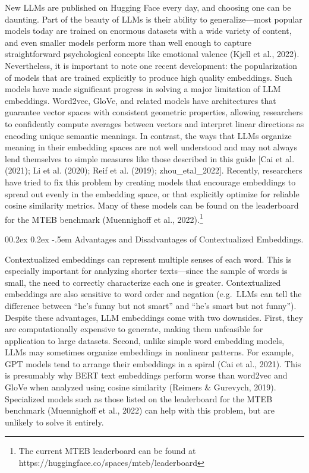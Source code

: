 \documentclass[
  man,
  floatsintext,
  longtable,
  nolmodern,
  notxfonts,
  notimes,
  colorlinks=true,linkcolor=blue,citecolor=blue,urlcolor=blue]{apa7}
\makeatletter
\renewcommand{\paragraph}{\@startsection{paragraph}{4}{\parindent}%
	{0\baselineskip \@plus 0.2ex \@minus 0.2ex}%
	{-.5em}%
	{\normalfont\normalsize\bfseries\typesectitle}}
\makeatother
\begin{document}
New LLMs are published on Hugging Face every day, and choosing one can
be daunting. Part of the beauty of LLMs is their ability to
generalize---most popular models today are trained on enormous datasets
with a wide variety of content, and even smaller models perform more
than well enough to capture straightforward psychological concepts like
emotional valence (Kjell et al., 2022). Nevertheless, it is important to
note one recent development: the popularization of models that are
trained explicitly to produce high quality embeddings. Such models have
made significant progress in solving a major limitation of LLM
embeddings. Word2vec, GloVe, and related models have architectures that
guarantee vector spaces with consistent geometric properties, allowing
researchers to confidently compute averages between vectors and
interpret linear directions as encoding unique semantic meanings. In
contrast, the ways that LLMs organize meaning in their embedding spaces
are not well understood and may not always lend themselves to simple
measures like those described in this guide {[}Cai et al. (2021); Li et
al. (2020); Reif et al. (2019); zhou\_etal\_2022{]}. Recently,
researchers have tried to fix this problem by creating models that
encourage embeddings to spread out evenly in the embedding space, or
that explicitly optimize for reliable cosine similarity metrics. Many of
these models can be found on the leaderboard for the MTEB benchmark
(Muennighoff et al., 2022).\footnote{The current MTEB leaderboard can be
  found at https://huggingface.co/spaces/mteb/leaderboard}

\paragraph{Advantages and Disadvantages of Contextualized
Embeddings.}\label{advantages-and-disadvantages-of-contextualized-embeddings}

Contextualized embeddings can represent multiple senses of each word.
This is especially important for analyzing shorter texts---since the
sample of words is small, the need to correctly characterize each one is
greater. Contextualized embeddings are also sensitive to word order and
negation (e.g.~LLMs can tell the difference between ``he's funny but not
smart'' and ``he's smart but not funny''). Despite these advantages, LLM
embeddings come with two downsides. First, they are computationally
expensive to generate, making them unfeasible for application to large
datasets. Second, unlike simple word embedding models, LLMs may
sometimes organize embeddings in nonlinear patterns. For example, GPT
models tend to arrange their embeddings in a spiral (Cai et al., 2021).
This is presumably why BERT text embeddings perform worse than word2vec
and GloVe when analyzed using cosine similarity (Reimers \& Gurevych,
2019). Specialized models such as those listed on the leaderboard for
the MTEB benchmark (Muennighoff et al., 2022) can help with this
problem, but are unlikely to solve it entirely.
\end{document}
